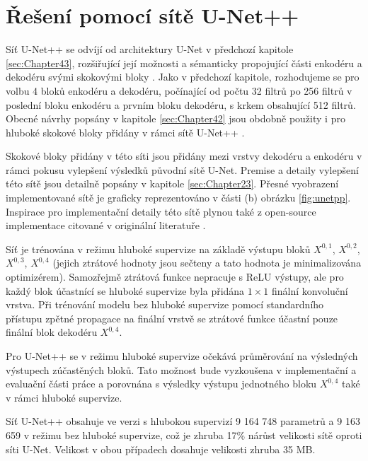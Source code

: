 \section{Řešení pomocí sítě U-Net++}
\label{sec:Chapter44}
Síť U-Net++ se odvíjí od architektury U-Net v předchozí kapitole \ref{sec:Chapter43}, rozšiřující její možnosti a sémanticky propojující části enkodéru a dekodéru svými skokovými bloky \cite{unetpp}. Jako v předchozí kapitole, rozhodujeme se pro volbu 4 bloků enkodéru a dekodéru, počínající od počtu 32 filtrů po 256 filtrů v poslední bloku enkodéru a prvním bloku dekodéru, s krkem obsahující 512 filtrů. Obecné návrhy popsány v kapitole \ref{sec:Chapter42} jsou obdobně použity i pro hluboké skokové bloky přidány v rámci sítě U-Net++ \cite{unetpp}.

Skokové bloky přidány v této síti jsou přidány mezi vrstvy dekodéru a enkodéru v rámci pokusu vylepšení výsledků původní sítě U-Net. Premise a detaily vylepšení této sítě jsou detailně popsány v kapitole \ref{sec:Chapter23}. Přesné vyobrazení implementované sítě je graficky reprezentováno v části (b) obrázku \ref{fig:unetpp}. Inspirace pro implementační detaily této sítě plynou také z open-source implementace citované v originální literatuře \cite{unetpp_github}.

Síť je trénována v režimu hluboké supervize na základě výstupu bloků $X^{0,1}$, $X^{0,2}$, $X^{0,3}$, $X^{0,4}$ (jejich ztrátové hodnoty jsou sečteny a tato hodnota je minimalizována optimizérem). Samozřejmě ztrátová funkce nepracuje s ReLU výstupy, ale pro každý blok účastnící se hluboké supervize byla přidána $1\times1$ finální konvoluční vrstva. Při trénování modelu bez hluboké supervize pomocí standardního přístupu zpětné propagace na finální vrstvě se ztrátové funkce účastní pouze finální blok dekodéru $X^{0, 4}$.

Pro U-Net++ se v režimu hluboké supervize očekává průměrování na výsledných výstupech zúčastěných bloků. Tato možnost bude vyzkoušena v implementační a evaluační části práce a porovnána s výsledky výstupu jednotného bloku $X^{0, 4}$ také v rámci hluboké supervize.

Síť U-Net++ obsahuje ve verzi s hlubokou supervizí 9 164 748 parametrů a 9 163 659 v režimu bez hluboké supervize, což je zhruba 17\% nárůst velikosti sítě oproti síti U-Net. Velikost v obou případech dosahuje velikosti zhruba 35 MB.
\endinput